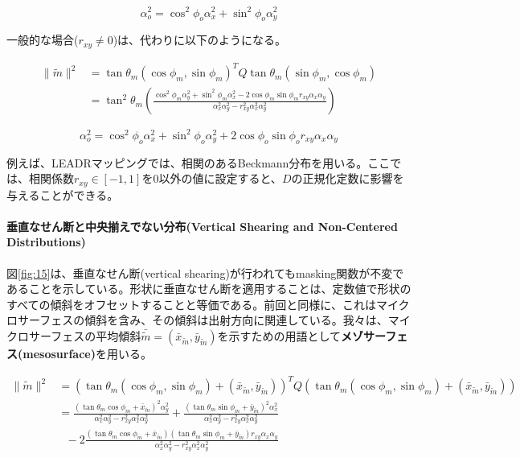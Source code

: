 \documentclass[a4j,xelatex,ja=standard]{bxjsarticle}
\begin{document}
\begin{equation}
    \alpha^2_o = \cos^2 \phi_o \alpha^2_x + \sin^2 \phi_o \alpha^2_y
    \label{eq:91}
\end{equation}

一般的な場合($r_{xy} \neq 0$)は、代わりに以下のようになる。

\begin{equation}
    \begin{split}
        \|\tilde{m}\|^2 & = \tan\theta_m(\cos\phi_m, \sin\phi_m)^T Q \tan\theta_m(\sin\phi_m, \cos\phi_m) \\
                        & = \tan^2 \theta_m \left( \frac{\cos^2 \phi_m \alpha^2_y + \sin^2 \phi_m \alpha^2_x - 2\cos\phi_m \sin\phi_m r_{xy} \alpha_x \alpha_y}{\alpha^2_x \alpha^2_y - r^2_{xy} \alpha^2_x \alpha^2_y} \right)
    \end{split}
    \label{eq:92}
\end{equation}

\begin{equation}
    \alpha^2_o = \cos^2 \phi_o \alpha^2_x + \sin^2 \phi_o \alpha^2_y + 2 \cos\phi_o \sin\phi_o r_{xy} \alpha_x \alpha_y
    \label{eq:93}
\end{equation}

例えば、LEADRマッピングでは、相関のあるBeckmann分布を用いる\cite{Dupuy2013}。ここでは、相関係数$r_{xy} \in [-1, 1]$を0以外の値に設定すると、$D$の正規化定数に影響を与えることができる。

\paragraph{垂直なせん断と中央揃えでない分布(Vertical Shearing and Non-Centered Distributions)}

図\ref{fig:15}は、垂直なせん断(vertical shearing)が行われてもmasking関数が不変であることを示している。形状に垂直なせん断を適用することは、定数値で形状のすべての傾斜をオフセットすることと等価である。前回と同様に、これはマイクロサーフェスの傾斜を含み、その傾斜は出射方向に関連している。我々は、マイクロサーフェスの平均傾斜$\bar{\tilde{m}} = (\bar{x}_{\tilde{m}}, \bar{y}_{\tilde{m}})$を示すための用語として\textbf{メゾサーフェス(mesosurface)}を用いる。

\begin{equation}
    \begin{split}
        \|\tilde{m}\|^2 & = (\tan\theta_m(\cos\phi_m, \sin\phi_m) + (\bar{x}_{\tilde{m}}, \bar{y}_{\tilde{m}}))^T Q (\tan\theta_m(\cos\phi_m, \sin\phi_m) + (\bar{x}_{\tilde{m}}, \bar{y}_{\tilde{m}})) \\
                        & = \frac{(\tan\theta_m \cos\phi_m + \bar{x}_{\tilde{m}})^2 \alpha^2_y}{\alpha^2_x \alpha^2_y - r^2_{xy} \alpha^2_x \alpha^2_y} + \frac{(\tan\theta_m \sin\phi_m + \bar{y}_{\tilde{m}})^2 \alpha^2_x}{\alpha^2_x \alpha^2_y - r^2_{xy} \alpha^2_x \alpha^2_y} \\
                        & \text{  } - 2\frac{(\tan\theta_m \cos\phi_m + \bar{x}_{\tilde{m}})(\tan\theta_m \sin\phi_m + \bar{y}_{\tilde{m}}) r_{xy} \alpha_x \alpha_y}{\alpha^2_x \alpha^2_y - r^2_{xy} \alpha^2_x \alpha^2_y}
    \end{split}
    \label{eq:95}
\end{equation}
\end{document}
